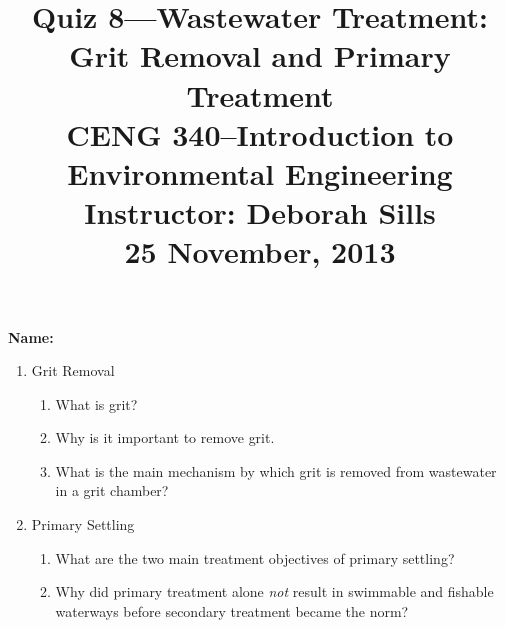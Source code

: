 \documentclass[12pt,letterpaper]{article}
\begin{document}
\setlength{\parindent}{0cm} 


\frenchspacing


\title {\large{\textbf{Quiz 8---Wastewater Treatment: Grit Removal and Primary Treatment}}\\ \large{CENG 340--Introduction to Environmental Engineering\\
Instructor: Deborah Sills\\
25 November, 2013}}
\author {}
\date {}
\maketitle

\vspace{-0.5 in}
\textbf{\large{Name:}}\\

\begin{enumerate}
\item Grit Removal

\begin{enumerate}

\item What is grit?
\vspace{1in}

\item Why is it important to remove grit.  

\vspace{1in}


\item What is the main mechanism by which grit is removed from wastewater in a grit chamber? 

\vspace{1in}


\end{enumerate}

\item Primary Settling

\begin{enumerate}

\item What are the two main treatment objectives of primary settling?

\vspace{1in}

\item Why did primary treatment alone \emph{not} result in swimmable and fishable waterways before secondary treatment became the norm?

\end{enumerate}




\end{enumerate}
\end{document}
